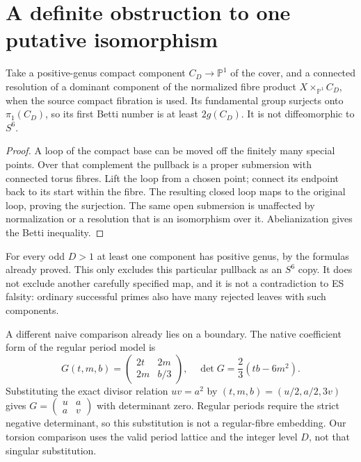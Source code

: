 \section{A definite obstruction to one putative isomorphism}
\begin{proposition}
Take a positive-genus compact component $C_D\to\mathbb P^1$ of the cover,
and a connected resolution of a dominant component of the normalized
fibre product $X\times_{\mathbb P^1}C_D$, when the source compact fibration
is used. Its fundamental group surjects onto $\pi_1(C_D)$, so its first
Betti number is at least $2g(C_D)$. It is not diffeomorphic to $S^6$.
\end{proposition}
\begin{proof}
A loop of the compact base can be moved off the finitely many special
points. Over that complement the pullback is a proper submersion with
connected torus fibres. Lift the loop from a chosen point; connect its
endpoint back to its start within the fibre. The resulting closed loop
maps to the original loop, proving the surjection. The same open
submersion is unaffected by normalization or a resolution that is an
isomorphism over it. Abelianization gives the Betti inequality.
\end{proof}
For every odd $D>1$ at least one component has positive genus, by the
formulas already proved. This only excludes this particular pullback as
an $S^6$ copy. It does not exclude another carefully specified map, and
it is not a contradiction to ES falsity: ordinary successful primes
also have many rejected leaves with such components.

A different naive comparison already lies on a boundary. The native
coefficient form of the regular period model is
\[
 G(t,m,b)=\begin{pmatrix}2t&2m\\2m&b/3\end{pmatrix},\quad
 \det G=\frac23(tb-6m^2).
\]
Substituting the exact divisor relation $uv=a^2$ by
$(t,m,b)=(u/2,a/2,3v)$ gives
$G=\left(\begin{smallmatrix}u&a\\a&v\end{smallmatrix}\right)$ with determinant
zero. Regular periods require the strict negative determinant, so this
substitution is not a regular-fibre embedding. Our torsion comparison
uses the valid period lattice and the integer level $D$, not that
singular substitution.

